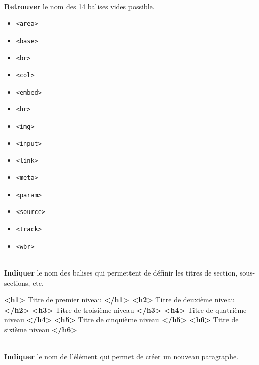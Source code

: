 \documentclass[a4paper,17pt]{extarticle}
\newenvironment{eleve}%
{\begin{activite}\color{noiramu}\\}
{\end{activite}}
\providecommand{\tightlist}{%
      \setlength{\itemsep}{0pt}\setlength{\parskip}{0pt}}
\newenvironment{Shaded}{}{}
\newcommand{\KeywordTok}[1]{\textcolor[rgb]{0.00,0.44,0.13}{\textbf{{#1}}}}
\newcommand{\NormalTok}[1]{{#1}}
\begin{document}
\begin{eleve}
    \textbf{Retrouver} le nom des 14 balises vides possible.
        
        \end{eleve}\begin{reponse}
    \begin{itemize}
\tightlist
\item
  \texttt{\textless{}area\textgreater{}}
\item
  \texttt{\textless{}base\textgreater{}}
\item
  \texttt{\textless{}br\textgreater{}}
\item
  \texttt{\textless{}col\textgreater{}}
\item
  \texttt{\textless{}embed\textgreater{}}
\item
  \texttt{\textless{}hr\textgreater{}}
\item
  \texttt{\textless{}img\textgreater{}}
\item
  \texttt{\textless{}input\textgreater{}}
\item
  \texttt{\textless{}link\textgreater{}}
\item
  \texttt{\textless{}meta\textgreater{}}
\item
  \texttt{\textless{}param\textgreater{}}
\item
  \texttt{\textless{}source\textgreater{}}
\item
  \texttt{\textless{}track\textgreater{}}
\item
  \texttt{\textless{}wbr\textgreater{}}
\end{itemize}

            \end{reponse}\begin{eleve}
    \textbf{Indiquer} le nom des balises qui permettent de définir les
titres de section, sous-sections, etc.
        
        \end{eleve}\begin{reponse}
    \begin{Shaded}
\begin{Highlighting}[]
\KeywordTok{<h1>}\NormalTok{ Titre de premier niveau }\KeywordTok{</h1>}
\KeywordTok{<h2>}\NormalTok{ Titre de deuxième niveau }\KeywordTok{</h2>}
\KeywordTok{<h3>}\NormalTok{ Titre de troisième niveau }\KeywordTok{</h3>}
\KeywordTok{<h4>}\NormalTok{ Titre de quatrième niveau }\KeywordTok{</h4>}
\KeywordTok{<h5>}\NormalTok{ Titre de cinquième niveau }\KeywordTok{</h5>}
\KeywordTok{<h6>}\NormalTok{ Titre de sixième niveau }\KeywordTok{</h6>}
\end{Highlighting}
\end{Shaded}

            \end{reponse}\begin{eleve}
    \textbf{Indiquer} le nom de l'élément qui permet de créer un nouveau
paragraphe.
        
        \end{eleve}
\end{document}
